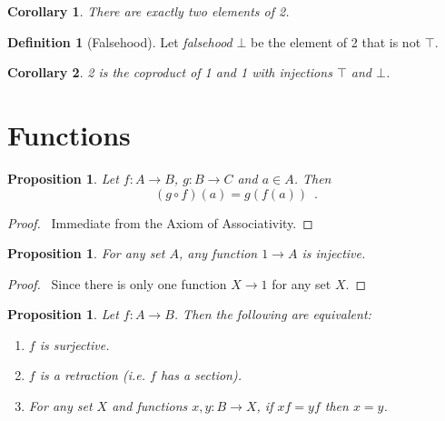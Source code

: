 \documentclass{book}
\let\qed\relax
\newtheorem{prop}[ax]{Proposition}
\newtheorem{cor}{Corollary}[ax]
\theoremstyle{definition}
\newtheorem{df}[ax]{Definition}
\begin{document}
\begin{cor}
There are exactly two elements of 2.
\end{cor}

\begin{df}[Falsehood]
Let \emph{falsehood} $\bot$ be the element of 2 that is not $\top$.
\end{df}

\begin{cor}
2 is the coproduct of 1 and 1 with injections $\top$ and $\bot$.
\end{cor}

\section{Functions}

\begin{prop}
Let $f : A \rightarrow B$, $g : B \rightarrow C$ and $a \in A$. Then
\[ (g \circ f)(a) = g(f(a)) \enspace . \]
\end{prop}

\begin{proof}
\pf\ Immediate from the Axiom of Associativity. \qed
\end{proof}

\begin{prop}
For any set $A$, any function $1 \rightarrow A$ is injective.
\end{prop}

\begin{proof}
\pf\ Since there is only one function $X \rightarrow 1$ for any set $X$. \qed
\end{proof}

\begin{prop}
Let $f : A \rightarrow B$. Then the following are equivalent:
\begin{enumerate}
\item $f$ is surjective.
\item $f$ is a retraction (i.e. $f$ has a section).
\item For any set $X$ and functions $x,y : B \rightarrow X$, if $xf = yf$ then $x = y$.
\end{enumerate}
\end{prop}
\end{document}
